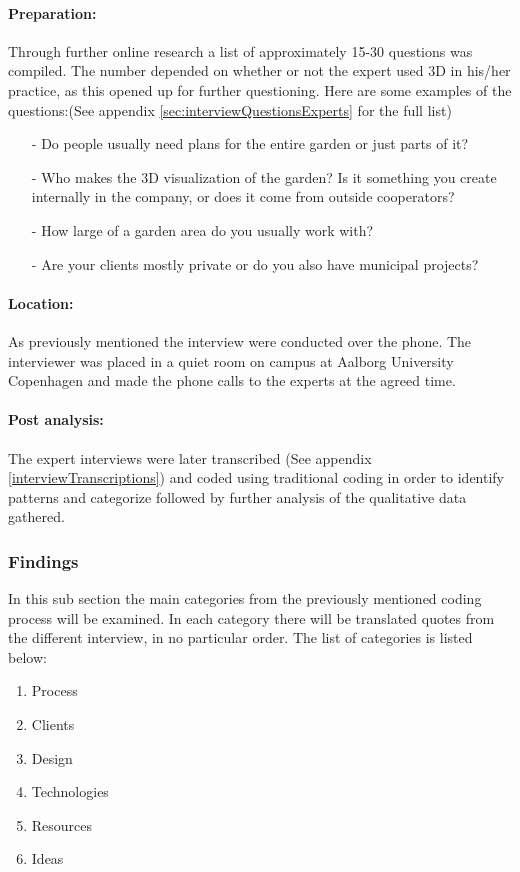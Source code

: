 		\paragraph*{Preparation:}
		Through further online research a list of approximately 15-30 questions was compiled. The number depended on whether or not the expert used 3D in his/her practice, as this opened up for further questioning. Here are some examples of the questions:(See appendix \ref{sec:interviewQuestionsExperts} for the full list)

		\begin{itemize}
			\item[-] Do people usually need plans for the entire garden or just parts of it?
			\item[-] Who makes the 3D visualization of the garden? Is it something you create internally in the company, or does it come from outside cooperators? 
			\item[-] How large of a garden area do you usually work with?
			\item[-] Are your clients mostly private or do you also have municipal projects?
		\end{itemize}
		
		\paragraph*{Location:}
		As previously mentioned the interview were conducted over the phone. The interviewer was placed in a quiet room on campus at Aalborg University Copenhagen and made the phone calls to the experts at the agreed time.

		\paragraph*{Post analysis:}The expert interviews were later transcribed (See appendix \ref{interviewTranscriptions}) and coded using traditional coding in order to identify patterns and categorize followed by further analysis of the qualitative data gathered.
		
		\subsubsection{Findings}
		In this sub section the main categories from the previously mentioned coding process will be examined. In each category there will be translated quotes from the different interview, in no particular order. The list of categories is listed below:
		\begin{enumerate}
			\item Process
			\item Clients
			\item Design
			\item Technologies
			\item Resources
			\item Ideas
		\end{enumerate}
	
